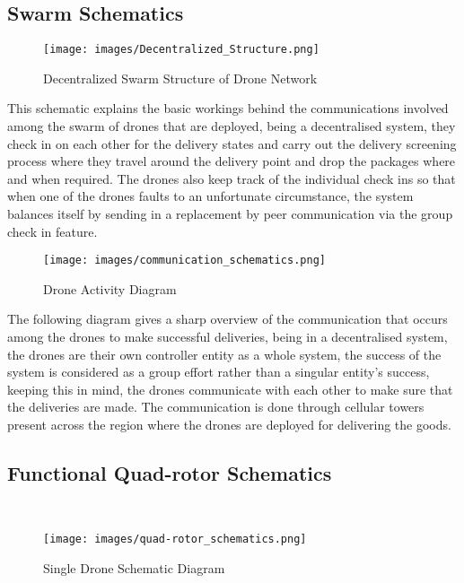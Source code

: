 \documentclass[preprint,12pt]{elsarticle}
\begin{document}
\subsection{Swarm Schematics}
\begin{figure}[!htbp]
    \centering
    \texttt{[image: images/Decentralized\_Structure.png]}
    \caption{Decentralized Swarm Structure of Drone Network}
\end{figure}

This schematic explains the basic workings behind the communications involved among the swarm of drones that are deployed, being a decentralised system, they check in on each other for the delivery states and carry out the delivery screening process where they travel around the delivery point and drop the packages where and when required. The drones also keep track of the individual check ins so that when one of the drones faults to an unfortunate circumstance, the system balances itself by sending in a replacement by peer communication via the group check in feature.\\

\begin{figure}[!htbp]
    \centering
    \texttt{[image: images/communication\_schematics.png]}
    \caption{Drone Activity Diagram}
\end{figure}

The following diagram gives a sharp overview of the communication that occurs among the drones to make successful deliveries, being in a decentralised system, the drones are their own controller entity as a whole system, the success of the system is considered as a group effort rather than a singular entity’s success, keeping this in mind, the drones communicate with each other to make sure that the deliveries are made. The communication is done through cellular towers present across the region where the drones are deployed for delivering the goods.\\

\subsection{Functional Quad-rotor Schematics}\\

\begin{figure}[!htbp]
    \centering
    \texttt{[image: images/quad-rotor\_schematics.png]}
    \caption{Single Drone Schematic Diagram}
\end{figure}
\end{document}
